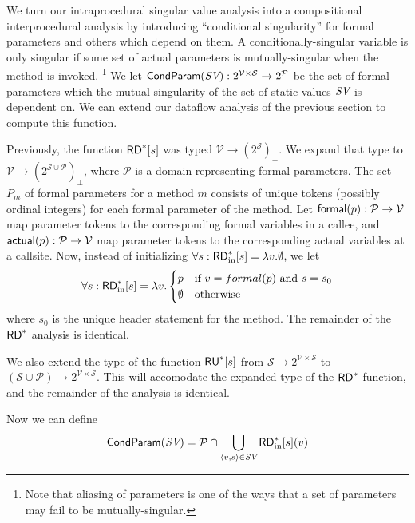 \documentclass[11pt,notitlepage]{article}
\newcommand{\bigvar}[1]{\ensuremath{\text{\it #1}}}
\newcommand{\func}[1]{\ensuremath{\text{\sffamily #1}}}
\begin{document}
We turn our intraprocedural singular value analysis into a compositional
interprocedural analysis by introducing ``conditional singularity''
for formal parameters and others which depend on them.  A
conditionally-singular variable is only singular if some set of actual
parameters is mutually-singular when the method is invoked.%
\footnote{Note that aliasing of parameters is one of the ways that
a set of parameters may fail to be mutually-singular.}
We let
$\func{CondParam}(\bigvar{SV}):2^\mathcal{V\times S}\to 2^\mathcal{P}$
be the set of formal parameters which the mutual singularity of the
set of static values $\bigvar{SV}$ is dependent on.  We can extend our dataflow
analysis of the previous section to compute this function.

Previously, the function $\func{RD}^*[s]$ was typed
$\mathcal{V}\to(2^\mathcal{S})_\bot$.  We expand that type to
$\mathcal{V}\to(2^{\mathcal{S}\cup\mathcal{P}})_\bot$, where
$\mathcal{P}$ is a domain
representing formal parameters.  The set $P_m$ of formal parameters for
a method $m$ consists of unique tokens (possibly ordinal integers) for
each formal parameter of the method.  Let
$\func{formal}(p):\mathcal{P\to V}$ map parameter tokens to the
corresponding formal variables in a callee, and
$\func{actual}(p):\mathcal{P\to V}$ map parameter tokens to the
corresponding actual variables at a callsite.
Now, instead of initializing $\forall s :
\func{RD}^*_\text{in}[s]=\lambda v.\emptyset$, we let
\begin{displaymath}
\forall s: \func{RD}^*_\text{in}[s]=\lambda v.\begin{cases}
p & \text{if }v=formal(p)\text{ and }s=s_0\\
\emptyset & \text{otherwise} \\
\end{cases}
\end{displaymath}
where $s_0$ is the unique header statement for the method.
The remainder of the $\func{RD}^*$ analysis is identical.

We also extend the type of the function $\func{RU}^*[s]$ from
$\mathcal{S}\to 2^\mathcal{V\times S}$ to
$(\mathcal{S}\cup\mathcal{P})\to 2^\mathcal{V\times S}$.
This will accomodate the expanded type of the $\func{RD}^*$ function,
and the remainder of the analysis is identical.

Now we can define
\begin{displaymath}
\func{CondParam}(\bigvar{SV}) = \mathcal{P} \cap
    \bigcup_{\tuple{v,s}\in\bigvar{SV}} \func{RD}^*_\text{in}[s](v)
\end{displaymath}
\end{document}
